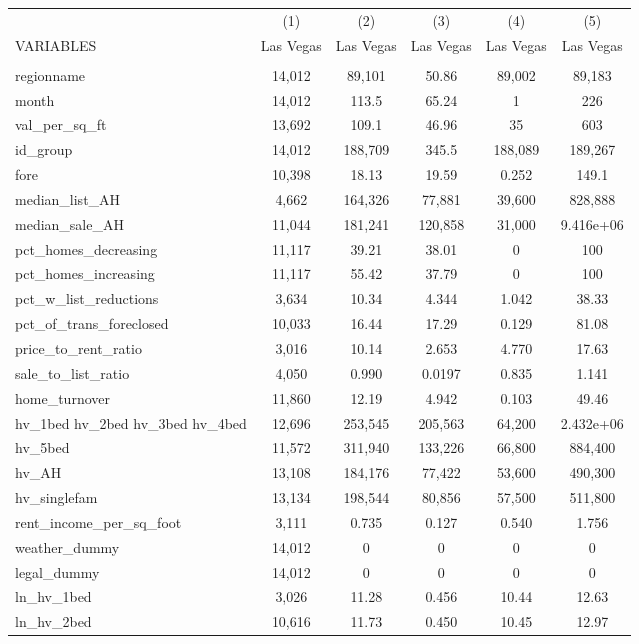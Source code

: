 \begin{tabular}{lccccc} \hline
 & (1) & (2) & (3) & (4) & (5) \\
VARIABLES & Las Vegas & Las Vegas & Las Vegas & Las Vegas & Las Vegas \\ \hline
 &  &  &  &  &  \\
regionname & 14,012 & 89,101 & 50.86 & 89,002 & 89,183 \\
month & 14,012 & 113.5 & 65.24 & 1 & 226 \\
val\_per\_sq\_ft & 13,692 & 109.1 & 46.96 & 35 & 603 \\
id\_group & 14,012 & 188,709 & 345.5 & 188,089 & 189,267 \\
fore & 10,398 & 18.13 & 19.59 & 0.252 & 149.1 \\
median\_list\_AH & 4,662 & 164,326 & 77,881 & 39,600 & 828,888 \\
median\_sale\_AH & 11,044 & 181,241 & 120,858 & 31,000 & 9.416e+06 \\
pct\_homes\_decreasing & 11,117 & 39.21 & 38.01 & 0 & 100 \\
pct\_homes\_increasing & 11,117 & 55.42 & 37.79 & 0 & 100 \\
pct\_w\_list\_reductions & 3,634 & 10.34 & 4.344 & 1.042 & 38.33 \\
pct\_of\_trans\_foreclosed & 10,033 & 16.44 & 17.29 & 0.129 & 81.08 \\
price\_to\_rent\_ratio & 3,016 & 10.14 & 2.653 & 4.770 & 17.63 \\
sale\_to\_list\_ratio & 4,050 & 0.990 & 0.0197 & 0.835 & 1.141 \\
home\_turnover & 11,860 & 12.19 & 4.942 & 0.103 & 49.46 \\
hv\_1bed 
hv\_2bed 
hv\_3bed 
hv\_4bed & 12,696 & 253,545 & 205,563 & 64,200 & 2.432e+06 \\
hv\_5bed & 11,572 & 311,940 & 133,226 & 66,800 & 884,400 \\
hv\_AH & 13,108 & 184,176 & 77,422 & 53,600 & 490,300 \\
hv\_singlefam & 13,134 & 198,544 & 80,856 & 57,500 & 511,800 \\
rent\_income\_per\_sq\_foot & 3,111 & 0.735 & 0.127 & 0.540 & 1.756 \\
weather\_dummy & 14,012 & 0 & 0 & 0 & 0 \\
legal\_dummy & 14,012 & 0 & 0 & 0 & 0 \\
ln\_hv\_1bed & 3,026 & 11.28 & 0.456 & 10.44 & 12.63 \\
ln\_hv\_2bed & 10,616 & 11.73 & 0.450 & 10.45 & 12.97 \\

\end{tabular}
